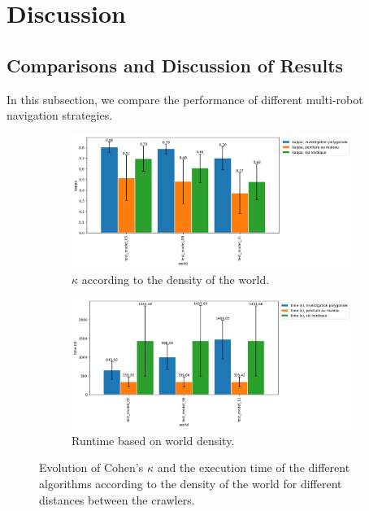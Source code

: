 
\chapter{Discussion}

\section{Comparisons and Discussion of Results}

In this subsection, we compare the performance of different multi-robot navigation strategies.

\begin{figure}[h!]
	\begin{subfigure}[t]{0.9\linewidth}
		\includegraphics[width=\linewidth]{graphics/investigation_polygonale-peinture_au_rouleau_ski_nordique-kappa_for_each_world_vs_investigation_polygonale-kappa_for_each_world.png}
		\caption{$\kappa$ according to the density of the world.}
		\label{fig:investigation_polygonale-peinture_au_rouleau_ski_nordique-kappa_for_each_world_vs_investigation_polygonale-kappa_for_each_d}
	\end{subfigure}
	\hfill
	\begin{subfigure}[t]{0.9\linewidth}
		\includegraphics[width=\linewidth]{graphics/investigation_polygonale-peinture_au_rouleau_ski_nordique-time_for_each_world_vs_investigation_polygonale-time_for_each_world.png}
		\caption{Runtime based on world density.}
		\label{fig:investigation_polygonale-peinture_au_rouleau_ski_nordique-time_for_each_world_vs_investigation_polygonale-time_for_each_d}
	\end{subfigure}
	\caption{Evolution of Cohen's $\kappa$ and the execution time of the different algorithms according to the density of the world for different distances between the crawlers.}
	\label{fig:investigation_polygonale-peinture_au_rouleau_ski_nordique_for_each_world}
\end{figure}

